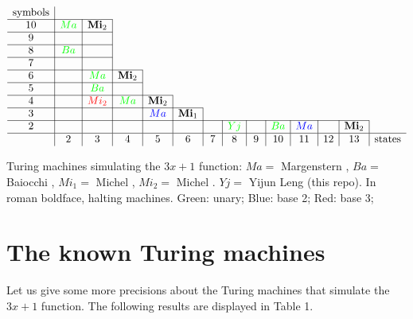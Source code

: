 \documentclass[10pt]{article}
\begin{document}
\begin{table}
$$\begin{array}{c|c|c|c|c|c|c|c|c|c|c|c|c|c}
\mbox{symbols} & \multicolumn{13}{c}{}\\                                                \cline{1-3}
10             & \textcolor{green}{Ma}    & \mbox{\bf Mi}_2& \multicolumn{11}{c}{}\\                       \cline{1-3}
9              &       &      &\multicolumn{11}{c}{}\\                                  \cline{1-3}
8              & \textcolor{green}{Ba}    &      &\multicolumn{11}{c}{}\\                                  \cline{1-3}
7              &       &      &\multicolumn{11}{c}{}\\                                  \cline{1-4}
6              &       & \textcolor{green}{Ma}   &  \mbox{\bf Mi}_2 & \multicolumn{10}{c}{}\\          \cline{1-4}
5              &       & \textcolor{green}{Ba}   &                  & \multicolumn{10}{c}{}\\          \cline{1-5}
4              &       & \textcolor{red}{Mi_2} & \textcolor{green}{Ma}               &\mbox{\bf Mi}_2 & \multicolumn{9}{c}{}\\         \cline{1-6}
3              &       &      &                  & \textcolor{blue}{Ma}   &\mbox{\bf Mi}_1 & \multicolumn{8}{c}{}\\  \cline{1-13}
2              &       &      &    &      &      &     & \textcolor{green}{Yj}   &   & \textcolor{green}{Ba}  & \textcolor{blue}{Ma} & & \mbox{\bf Mi}_2\\  \hline
               & 2     & 3    & 4  & 5    &\,6\, &\,7\,&\,8\,&\,9\,& 10  & 11 & 12 & 13 & \mbox{states}
\end{array}$$
\caption{Turing machines simulating the $3x + 1$ function:
$Ma=$ Margenstern \cite{Ma98,Ma00},
$Ba=$ Baiocchi \cite{Ba98},
$Mi_1=$ Michel \cite{Mi93},
$Mi_2=$ Michel \cite{Mi14}.
$Yj=$ Yijun Leng (this repo).
In roman boldface, halting machines.
Green: unary;
Blue: base 2;
Red: base 3;
}
\end{table}

\section{The known Turing machines}
Let us give some more precisions about the Turing machines that simulate
the $3x + 1$ function. The following results are displayed in Table 1.
\end{document}
